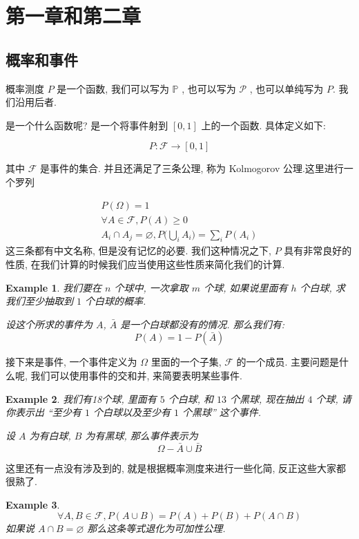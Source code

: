 \documentclass[a4paper, 10pt]{ctexart} %
\newtheorem{example}{\llap{$\rhd$ \space}Example}
\begin{document}
\section{第一章和第二章}
\subsection{概率和事件}
概率测度 $P$ 是一个函数, 我们可以写为 $\mathbb{P}$ , 也可以写为 $\mathscr P$ , 也可以单纯写为 $P$. 我们沿用后者. 

是一个什么函数呢? 是一个将事件射到 $[0,1]$ 上的一个函数. 具体定义如下:

$$P: \mathscr F \to \left[ 0,1 \right]$$

其中 $\mathscr F $ 是事件的集合.  并且还满足了三条公理, 称为 Kolmogorov 公理.这里进行一个罗列

\begin{gather}
   P\left(\Omega    \right) = 1\\
 \forall  A \in \mathscr F , P\left(A\right) \ge 0\\
    A_{i} \cap A_{j} = \varnothing , P\Big(\bigcup_{i} A_{i}\Big) = \sum_{i} P\left(A_{i}\right)
\end{gather}
这三条都有中文名称, 但是没有记忆的必要. 我们这种情况之下, $P$ 具有非常良好的性质, 在我们计算的时候我们应当使用这些性质来简化我们的计算.

\begin{example}
    我们要在 $n$ 个球中, 一次拿取 $m$ 个球, 如果说里面有 $h$ 个白球, 求我们至少抽取到 $1$ 个白球的概率.

    设这个所求的事件为 $A$, $\bar A$ 是一个白球都没有的情况. 那么我们有:
    \[
    P\left(A\right)  = 1 - P\left(\bar A\right)
    \]
\end{example}

接下来是事件, 一个事件定义为 $\Omega$ 里面的一个子集, $\mathscr F$ 的一个成员. 主要问题是什么呢, 我们可以使用事件的交和并, 来简要表明某些事件.
\begin{example}
    我们有18个球, 里面有 $5$ 个白球, 和 $13$ 个黑球, 现在抽出 $4$ 个球, 请你表示出 ``至少有 $1$ 个白球以及至少有 $1$ 个黑球'' 这个事件.

    设 $A$ 为有白球, $B$ 为有黑球, 那么事件表示为 
    \[
    \Omega - \bar A\cup\bar B
    \]
\end{example}

这里还有一点没有涉及到的, 就是根据概率测度来进行一些化简, 反正这些大家都很熟了. 
\begin{example}
    \[
    \forall  A , B \in \mathscr F,   P\left(A \cup  B     \right) =  P\left(A\right) + P\left(B\right) + P\left(A \cap B\right)
    \]
    如果说 $A\cap B = \varnothing $ 那么这条等式退化为可加性公理. 
\end{example}
\end{document}
